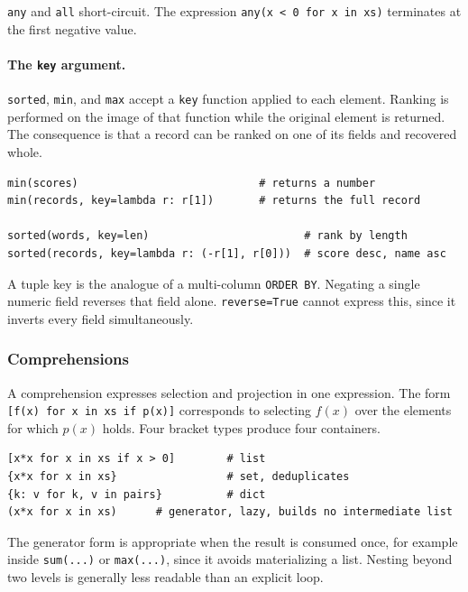 \texttt{any} and \texttt{all} short-circuit. The expression
\texttt{any(x < 0 for x in xs)} terminates at the first negative value.

\paragraph{The \texttt{key} argument.} \texttt{sorted}, \texttt{min}, and
\texttt{max} accept a \texttt{key} function applied to each element. Ranking
is performed on the image of that function while the original element is
returned. The consequence is that a record can be ranked on one of its fields
and recovered whole.

\begin{lstlisting}[style=python, caption={Ranking on a field, returning the record}]
min(scores)                            # returns a number
min(records, key=lambda r: r[1])       # returns the full record

sorted(words, key=len)                        # rank by length
sorted(records, key=lambda r: (-r[1], r[0]))  # score desc, name asc
\end{lstlisting}

A tuple key is the analogue of a multi-column \texttt{ORDER BY}. Negating a
single numeric field reverses that field alone. \texttt{reverse=True} cannot
express this, since it inverts every field simultaneously.

\subsubsection*{Comprehensions}

A comprehension expresses selection and projection in one expression. The form
\texttt{[f(x) for x in xs if p(x)]} corresponds to selecting $f(x)$ over the
elements for which $p(x)$ holds. Four bracket types produce four containers.

\begin{lstlisting}[style=python, caption={The four forms}]
[x*x for x in xs if x > 0]        # list
{x*x for x in xs}                 # set, deduplicates
{k: v for k, v in pairs}          # dict
(x*x for x in xs)      # generator, lazy, builds no intermediate list
\end{lstlisting}

The generator form is appropriate when the result is consumed once, for
example inside \texttt{sum(...)} or \texttt{max(...)}, since it avoids
materializing a list. Nesting beyond two levels is generally less readable
than an explicit loop.

